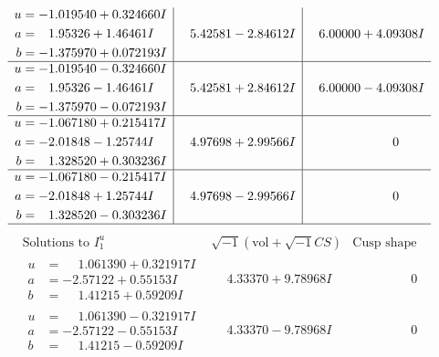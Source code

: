 \documentclass[1p]{elsarticle_modified}
\theoremstyle{definition}
\newcommand{\I}{\sqrt{-1}}
\begin{document}
$$\begin{array}{c|c|c}
\begin{aligned}
u &= -1.019540 + 0.324660 I \\
a &= \phantom{-}1.95326 + 1.46461 I \\
b &= -1.375970 + 0.072193 I\end{aligned}
 & \phantom{-}5.42581 - 2.84612 I & \phantom{-}6.00000 + 4.09308 I \\ \hline\begin{aligned}
u &= -1.019540 - 0.324660 I \\
a &= \phantom{-}1.95326 - 1.46461 I \\
b &= -1.375970 - 0.072193 I\end{aligned}
 & \phantom{-}5.42581 + 2.84612 I & \phantom{-}6.00000 - 4.09308 I \\ \hline\begin{aligned}
u &= -1.067180 + 0.215417 I \\
a &= -2.01848 - 1.25744 I \\
b &= \phantom{-}1.328520 + 0.303236 I\end{aligned}
 & \phantom{-}4.97698 + 2.99566 I & \phantom{-0.000000 } 0 \\ \hline\begin{aligned}
u &= -1.067180 - 0.215417 I \\
a &= -2.01848 + 1.25744 I \\
b &= \phantom{-}1.328520 - 0.303236 I\end{aligned}
 & \phantom{-}4.97698 - 2.99566 I & \phantom{-0.000000 } 0\\
 \hline 
 \end{array}$$\newpage$$\begin{array}{c|c|c}  
\text{Solutions to }I^u_{1}& \I (\text{vol} + \sqrt{-1}CS) & \text{Cusp shape}\\
 \hline 
\begin{aligned}
u &= \phantom{-}1.061390 + 0.321917 I \\
a &= -2.57122 + 0.55153 I \\
b &= \phantom{-}1.41215 + 0.59209 I\end{aligned}
 & \phantom{-}4.33370 + 9.78968 I & \phantom{-0.000000 } 0 \\ \hline\begin{aligned}
u &= \phantom{-}1.061390 - 0.321917 I \\
a &= -2.57122 - 0.55153 I \\
b &= \phantom{-}1.41215 - 0.59209 I\end{aligned}
 & \phantom{-}4.33370 - 9.78968 I & \phantom{-0.000000 } 0 \\ \hline\begin{aligned}

\end{aligned}
\end{array}$$
\end{document}
